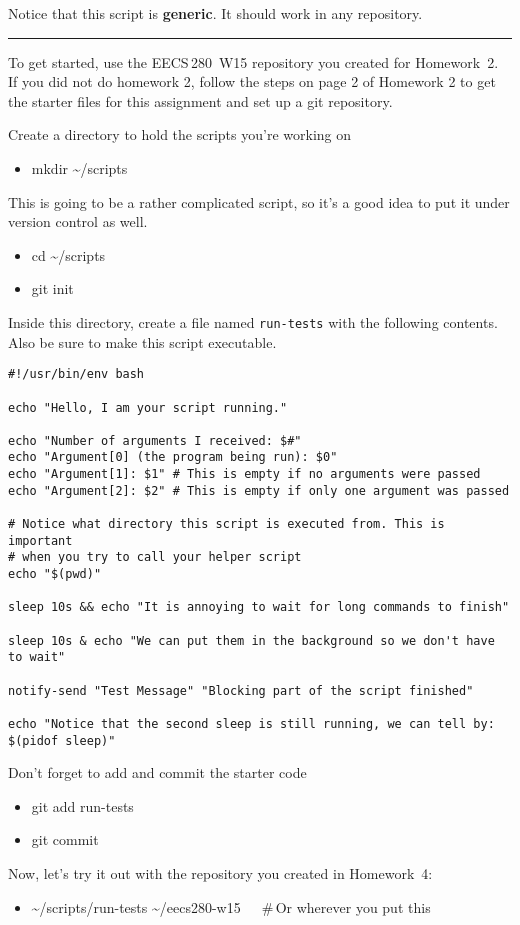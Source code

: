 \documentclass{article}
\begin{document}
\medskip
\noindent
Notice that this script is \textbf{generic}. It should work in any repository.

\bigskip
\hrule
\bigskip

\medskip
\noindent
To get started, use the EECS\,280~W15 repository you created for Homework~2. If you did not do homework 2, follow the steps on page 2 of Homework 2 to get the starter files for this assignment and set up a git repository.

\medskip
\noindent
Create a directory to hold the scripts you're working on
\begin{itemize}\tt
  \item mkdir \textasciitilde/scripts
\end{itemize}
This is going to be a rather complicated script, so it's a good
idea to put it under version control as well.
\begin{itemize}\tt
  \item cd \textasciitilde/scripts
  \item git init
\end{itemize}
Inside this directory, create a file named \texttt{run-tests} with the
following contents.  Also be sure to make this script executable.
\begin{lstlisting}
#!/usr/bin/env bash

echo "Hello, I am your script running."

echo "Number of arguments I received: $#"
echo "Argument[0] (the program being run): $0"
echo "Argument[1]: $1" # This is empty if no arguments were passed
echo "Argument[2]: $2" # This is empty if only one argument was passed

# Notice what directory this script is executed from. This is important
# when you try to call your helper script
echo "$(pwd)"

sleep 10s && echo "It is annoying to wait for long commands to finish"

sleep 10s & echo "We can put them in the background so we don't have to wait"

notify-send "Test Message" "Blocking part of the script finished"

echo "Notice that the second sleep is still running, we can tell by: $(pidof sleep)"
\end{lstlisting}
%
Don't forget to add and commit the starter code
\begin{itemize}\tt
  \item git add run-tests
  \item git commit
\end{itemize}
%
Now, let's try it out with the repository you created in Homework~4:
\begin{itemize}\tt
  \item \textasciitilde/scripts/run-tests \textasciitilde/eecs280-w15~~~\#\,Or wherever you put this
\end{itemize}
\end{document}

